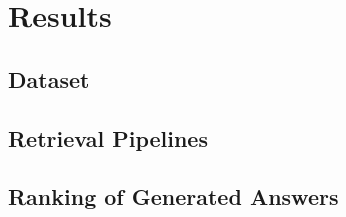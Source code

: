 \chapter{Results}\label{chapter:results}
\section{Dataset}

\section{Retrieval Pipelines}

\section{Ranking of Generated Answers}